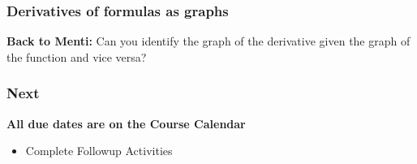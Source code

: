\documentclass{beamer}
\begin{document}
\begin{frame}
    \frametitle{Derivatives of formulas as graphs}

    \textbf{Back to Menti:} Can you identify the graph of the derivative given the graph of the function and vice versa? 

\end{frame}


\begin{frame}
    \frametitle{Next}

\textbf{All due dates are on the Course Calendar}


    \begin{itemize}
        \item Complete Followup Activities
    \end{itemize}

\end{frame}
 
\end{document}
